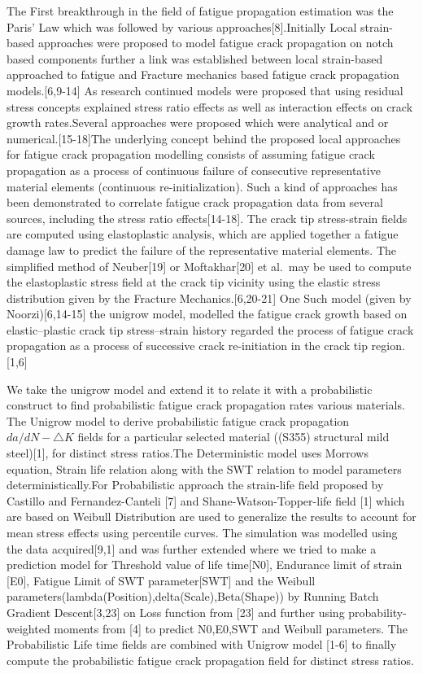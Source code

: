 \documentclass[11pt]{article}
\begin{document}
The First breakthrough in the field of fatigue propagation estimation
was the Paris' Law which was followed by various
approaches{[}8{]}.Initially Local strain-based approaches were proposed
to model fatigue crack propagation on notch based components further a
link was established between local strain-based approached to fatigue
and Fracture mechanics based fatigue crack propagation
models.{[}6,9-14{]} As research continued models were proposed that
using residual stress concepts explained stress ratio effects as well as
interaction effects on crack growth rates.Several approaches were
proposed which were analytical and or numerical.{[}15-18{]}The
underlying concept behind the proposed local approaches for fatigue
crack propagation modelling consists of assuming fatigue crack
propagation as a process of continuous failure of consecutive
representative material elements (continuous re-initialization). Such a
kind of approaches has been demonstrated to correlate fatigue crack
propagation data from several sources, including the stress ratio
effects{[}14-18{]}. The crack tip stress-strain fields are computed
using elastoplastic analysis, which are applied together a fatigue
damage law to predict the failure of the representative material
elements. The simplified method of Neuber{[}19{]} or Moftakhar{[}20{]}
et al.~may be used to compute the elastoplastic stress field at the
crack tip vicinity using the elastic stress distribution given by the
Fracture Mechanics.{[}6,20-21{]} One Such model (given by
Noorzi){[}6,14-15{]} the unigrow model, modelled the fatigue crack
growth based on elastic--plastic crack tip stress--strain history
regarded the process of fatigue crack propagation as a process of
successive crack re-initiation in the crack tip region. {[}1,6{]}

We take the unigrow model and extend it to relate it with a
probabilistic construct to find probabilistic fatigue crack propagation
rates various materials. The Unigrow model to derive probabilistic
fatigue crack propagation \(da/dN-\bigtriangleup K\) fields for a
particular selected material ((S355) structural mild steel){[}1{]}, for
distinct stress ratios.The Deterministic model uses Morrows equation,
Strain life relation along with the SWT relation to model parameters
deterministically.For Probabilistic approach the strain-life field
proposed by Castillo and Fernandez-Canteli {[}7{]} and
Shane-Watson-Topper-life field {[}1{]} which are based on Weibull
Distribution are used to generalize the results to account for mean
stress effects using percentile curves. The simulation was modelled
using the data acquired{[}9,1{]} and was further extended where we tried
to make a prediction model for Threshold value of life time{[}N0{]},
Endurance limit of strain {[}E0{]}, Fatigue Limit of SWT
parameter{[}SWT{]} and the Weibull
parameters(lambda(Position),delta(Scale),Beta(Shape)) by Running Batch
Gradient Descent{[}3,23{]} on Loss function from {[}23{]} and further
using probability-weighted moments from {[}4{]} to predict N0,E0,SWT and
Weibull parameters. The Probabilistic Life time fields are combined with
Unigrow model {[}1-6{]} to finally compute the probabilistic fatigue
crack propagation field for distinct stress ratios.
\end{document}
